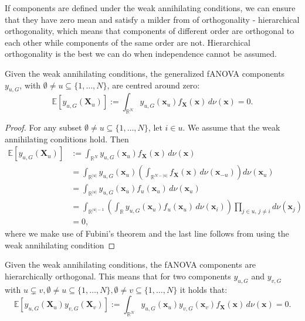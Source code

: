 If components are defined under the weak annihilating conditions, we can ensure that they have zero mean and satisfy a milder from of orthogonality - hierarchical orthogonality, which means that components of different order are orthogonal to each other while components of the same order are not. Hierarchical orthogonality is the best we can do when independence cannot be assumed.
\begin{proposition}
    Given the weak annihilating conditions, the generalized fANOVA components $y_{u, G}$, with $\emptyset \neq u \subseteq \{1, \ldots, N\}$, are centred around zero:
\begin{equation}
    \mathbb{E}[y_{u, G}(\boldsymbol{X}_u)] := \int_{\mathbb{R}^N} y_{u, G}(\boldsymbol{x}_u) f_{\boldsymbol{X}}(\boldsymbol{x}) \, d\nu (\boldsymbol{x}) = 0.
    \label{eq:zero_mean_g}
\end{equation}
\end{proposition}

\begin{proof}
For any subset $\emptyset \ne u \subseteq \{1, \ldots, N\}$, let $i \in u$. We assume that the weak annihilating conditions hold. Then
\begin{align*}
\mathbb{E}[y_{u,G}(\boldsymbol{X}_u)] 
&:= \int_{\mathbb{R}^N} y_{u,G}(\boldsymbol{x}_u) f_{\boldsymbol{X}}(\boldsymbol{x})\, d \nu (\boldsymbol{x}) \\
&= \int_{\mathbb{R}^{|u|}} y_{u,G}(\boldsymbol{x}_u) \left( \int_{\mathbb{R}^{N - |u|}} f_{\boldsymbol{X}}(\boldsymbol{x}) \, d \nu(\boldsymbol{x}_{-u}) \right) d \nu(\boldsymbol{x}_u) \\
&= \int_{\mathbb{R}^{|u|}} y_{u,G}(\boldsymbol{x}_u) f_u(\boldsymbol{x}_u)\, d \nu(\boldsymbol{x}_u) \\
&= \int_{\mathbb{R}^{|u| - 1}} \left( \int_{\mathbb{R}} y_{u,G}(\boldsymbol{x}_u) f_u(\boldsymbol{x}_u) \, d \nu(\boldsymbol{x}_i) \right) \prod_{j \in u,\, j \ne i} d \nu(\boldsymbol{x}_j) \\
&= 0,
\end{align*}
where we make use of Fubini's theorem and the last line follows from using the weak annihilating condition %
\end{proof}

\begin{proposition}
    Given the weak annihilating conditions, the fANOVA components are hierarchically orthogonal. This means that for two components $y_{u, G}$ and $y_{v, G}$ with $u \subsetneq v, \emptyset \neq u \subseteq \{1, \ldots, N\}, \emptyset \neq v \subseteq \{1, \ldots, N\} $ it holds that:
\begin{equation}
    \mathbb{E}[y_{u, G}(\boldsymbol{X}_u)y_{v, G}(\boldsymbol{X}_v)] := \int_{\mathbb{R}^N} y_{u, G}(\boldsymbol{x}_u) y_{v, G}(\boldsymbol{x}_v) f_{\boldsymbol{X}}(\boldsymbol{x}) \, d\nu (\boldsymbol{x}) = 0.
\end{equation}
\label{eq:orthogonality_g}
\end{proposition}

